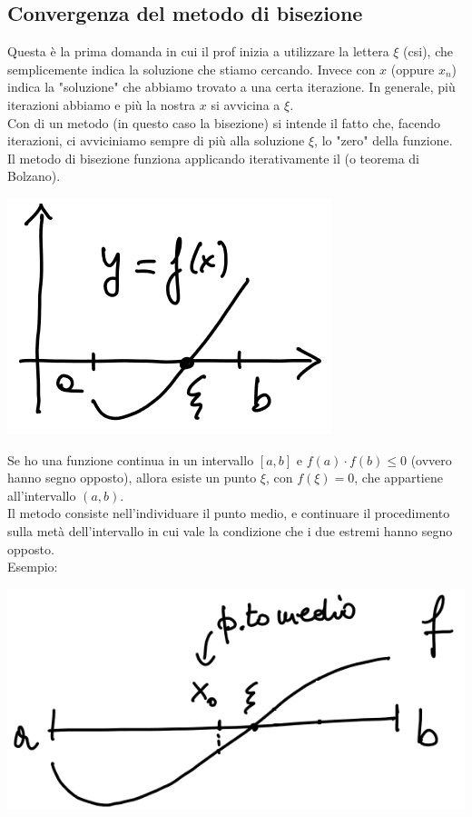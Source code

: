 \newpage
\subsection{Convergenza del metodo di bisezione}
Questa è la prima domanda in cui il prof inizia a utilizzare la lettera $\xi$ (csi), che semplicemente indica la soluzione che stiamo cercando. Invece con $x$ (oppure $x_n$) indica la "soluzione" che abbiamo trovato a una certa iterazione. In generale, più iterazioni abbiamo e più la nostra $x$ si avvicina a $\xi$.\\
Con  di un metodo (in questo caso la bisezione) si intende il fatto che, facendo iterazioni, ci avviciniamo sempre di più alla soluzione $\xi$, lo "zero" della funzione.\\
Il metodo di bisezione funziona applicando iterativamente il  (o teorema di Bolzano).
\begin{center}
    \includegraphics[scale=0.6]{./res/img/bisezione1.png}
\end{center}
Se ho una funzione continua in un intervallo $[a,b]$ e $f(a) \cdot f(b)\leq 0$ (ovvero hanno segno opposto), allora esiste un punto $\xi$, con $f(\xi)=0$, che appartiene all'intervallo $(a,b)$.\\
Il metodo consiste nell'individuare il punto medio, e continuare il procedimento sulla metà dell'intervallo in cui vale la condizione che i due estremi hanno segno opposto.\\
Esempio:
\begin{center}
    \includegraphics[scale=0.6]{./res/img/bisezione2.png}
\end{center}

